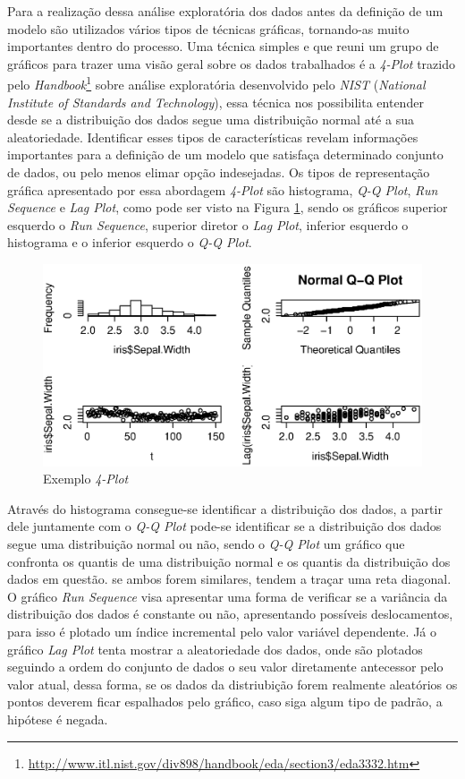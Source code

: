 Para a realização dessa análise exploratória dos dados antes da definição de um
modelo são utilizados vários tipos de técnicas gráficas, tornando-as muito
importantes dentro do processo. Uma técnica simples e que reuni um grupo de
gráficos para trazer uma visão geral sobre os dados trabalhados é a
\textit{4-Plot} trazido pelo
\textit{Handbook}\footnote{\url{http://www.itl.nist.gov/div898/handbook/eda/section3/eda3332.htm}}
sobre análise exploratória desenvolvido pelo \textit{NIST} (\textit{National
Institute of Standards and Technology}), essa técnica nos possibilita entender
desde se a distribuição dos dados segue uma distribuição normal até a sua
aleatoriedade. Identificar esses tipos de características revelam informações
importantes para a definição de um modelo que satisfaça determinado conjunto de
dados, ou pelo menos elimar opção indesejadas. Os tipos de representação gráfica
apresentado por essa abordagem \textit{4-Plot} são histograma, \textit{Q-Q
Plot}, \textit{Run Sequence} e \textit{Lag Plot}, como pode ser visto na Figura
\ref{fig:4-plot}, sendo os gráficos superior esquerdo o \textit{Run Sequence},
superior diretor o \textit{Lag Plot}, inferior esquerdo o histograma e o
inferior esquerdo o \textit{Q-Q Plot}.

\begin{figure}[h]
  \centering
  \includegraphics[width=1.0\textwidth]
      {figuras/4-plot}
      \caption{Exemplo \textit{4-Plot}}
  \label{fig:4-plot}
\end{figure}

Através do histograma consegue-se identificar a distribuição dos dados, a partir
dele juntamente com o \textit{Q-Q Plot} pode-se identificar se a distribuição
dos dados segue uma distribuição normal ou não, sendo o \textit{Q-Q Plot} um
gráfico que confronta os quantis de uma distribuição normal e os quantis da
distribuição dos dados em questão. se ambos forem similares, tendem a traçar uma
reta diagonal. O gráfico \textit{Run Sequence} visa apresentar uma forma de
verificar se a variância da distribuição dos dados é constante ou não,
apresentando possíveis deslocamentos, para isso é plotado um índice incremental
pelo valor variável dependente. Já o gráfico \textit{Lag Plot} tenta mostrar a
aleatoriedade dos dados, onde são plotados seguindo a ordem do conjunto de dados
o seu valor diretamente antecessor pelo valor atual, dessa forma, se os dados da
distriubição forem realmente aleatórios os pontos deverem ficar espalhados pelo
gráfico, caso siga algum tipo de padrão, a hipótese é negada.


